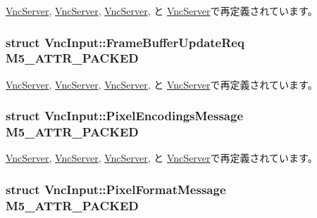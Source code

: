 \hyperlink{group__VncConstants_ga2f0a8a1f1c40593e1e01ce4b8087d792}{VncServer}, \hyperlink{group__VncConstants_ga357314e013d6289c7d085fadd56a290c}{VncServer}, \hyperlink{group__VncConstants_gab34a91a8552f4b2f7e2806b835f39780}{VncServer}, と \hyperlink{group__VncConstants_gac782a3823c0bb07395a234047394d59e}{VncServer}で再定義されています。\hypertarget{classVncInput_a01eadfa05c0ec19fe90849fab8e5706d}{
\subsubsection[{M5\_\-ATTR\_\-PACKED}]{\setlength{\rightskip}{0pt plus 5cm}struct {\bf VncInput::FrameBufferUpdateReq}  {\bf M5\_\-ATTR\_\-PACKED}}}
\label{classVncInput_a01eadfa05c0ec19fe90849fab8e5706d}


\hyperlink{group__VncConstants_ga2f0a8a1f1c40593e1e01ce4b8087d792}{VncServer}, \hyperlink{group__VncConstants_ga357314e013d6289c7d085fadd56a290c}{VncServer}, \hyperlink{group__VncConstants_gab34a91a8552f4b2f7e2806b835f39780}{VncServer}, と \hyperlink{group__VncConstants_gac782a3823c0bb07395a234047394d59e}{VncServer}で再定義されています。\hypertarget{classVncInput_a83b7836548f8715b41fad8160b0bb6dd}{
\subsubsection[{M5\_\-ATTR\_\-PACKED}]{\setlength{\rightskip}{0pt plus 5cm}struct {\bf VncInput::PixelEncodingsMessage}  {\bf M5\_\-ATTR\_\-PACKED}}}
\label{classVncInput_a83b7836548f8715b41fad8160b0bb6dd}


\hyperlink{group__VncConstants_ga2f0a8a1f1c40593e1e01ce4b8087d792}{VncServer}, \hyperlink{group__VncConstants_ga357314e013d6289c7d085fadd56a290c}{VncServer}, \hyperlink{group__VncConstants_gab34a91a8552f4b2f7e2806b835f39780}{VncServer}, と \hyperlink{group__VncConstants_gac782a3823c0bb07395a234047394d59e}{VncServer}で再定義されています。\hypertarget{classVncInput_a461bacc0429ad882aeab850f7dbc363b}{
\subsubsection[{M5\_\-ATTR\_\-PACKED}]{\setlength{\rightskip}{0pt plus 5cm}struct {\bf VncInput::PixelFormatMessage}  {\bf M5\_\-ATTR\_\-PACKED}}}
\label{classVncInput_a461bacc0429ad882aeab850f7dbc363b}


